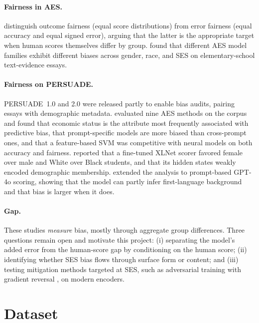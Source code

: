 \documentclass{article}
\begin{document}
\paragraph{Fairness in AES.} \citet{loukina2019fairness} distinguish outcome fairness (equal score distributions) from error fairness (equal accuracy and equal signed error), arguing that the latter is the appropriate target when human scores themselves differ by group. \citet{litman2021fairness} found that different AES model families exhibit different biases across gender, race, and SES on elementary-school text-evidence essays.

\paragraph{Fairness on PERSUADE.} PERSUADE~1.0 and 2.0 \citep{crossley2022persuade,crossley2024persuade} were released partly to enable bias audits, pairing essays with demographic metadata. \citet{yang2024tapestry} evaluated nine AES methods on the corpus and found that economic status is the attribute most frequently associated with predictive bias, that prompt-specific models are more biased than cross-prompt ones, and that a feature-based SVM was competitive with neural models on both accuracy and fairness. \citet{kwako2024guess} reported that a fine-tuned XLNet scorer favored female over male and White over Black students, and that its hidden states weakly encoded demographic membership. \citet{yang2025prompt} extended the analysis to prompt-based GPT-4o scoring, showing that the model can partly infer first-language background and that bias is larger when it does.

\paragraph{Gap.} These studies \emph{measure} bias, mostly through aggregate group differences. Three questions remain open and motivate this project: (i) separating the model's added error from the human-score gap by conditioning on the human score; (ii) identifying whether SES bias flows through surface form or content; and (iii) testing mitigation methods targeted at SES, such as adversarial training with gradient reversal \citep{ganin2016domain,zhang2018mitigating}, on modern encoders.

\section{Dataset}
\label{sec:data}
\end{document}
